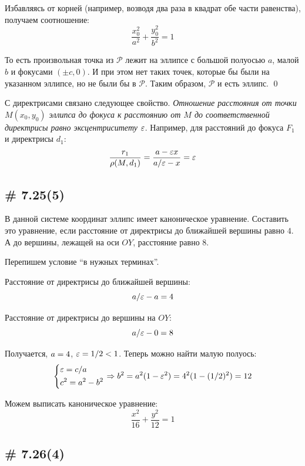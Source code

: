 \documentclass[a4paper,12pt]{article}
\begin{document}
  Избавляясь от корней (например, возводя два раза в квадрат обе части равенства), получаем соотношение:
  \[
    \frac{x_0^2}{a^2} + \frac{y_0^2}{b^2} = 1
  \]
  
  То есть произвольная точка из $\mathcal P$ лежит на эллипсе с большой полуосью $a$, малой $b$ и фокусами $(\pm c, 0)$.
  И при этом нет таких точек, которые бы были на указанном эллипсе, но не были бы в $\mathcal P$.
  Таким образом, $\mathcal P$ и есть эллипс. \qed
  
  \medskip
  
  С директрисами связано следующее свойство.
  \emph{Отношение расстояния от точки $M(x_0, y_0)$ эллипса до фокуса к расстоянию от $M$ до соответственной директрисы равно эксцентриситету $\varepsilon$}.
  Например, для расстояний до фокуса $F_1$ и директрисы $d_1$:
  \[
    \frac{r_1}{\rho(M, d_1)} = \frac{a - \varepsilon x}{a/\varepsilon - x} = \varepsilon
  \]
  
  
  \subsection{\# 7.25(5)}
  
  В данной системе координат эллипс имеет каноническое уравнение.
  Составить это уравнение, если расстояние от директрисы до ближайшей вершины равно $4$.
  А до вершины, лежащей на оси $OY$, расстояние равно $8$.
  
  \begin{solution}
    Перепишем условие ``в нужных терминах''.
    
    Расстояние от директрисы до ближайшей вершины:
    \[
      a/\varepsilon - a = 4
    \]
    
    Расстояние от директрисы до вершины на $OY$:
    \[
      a/\varepsilon - 0 = 8
    \]
    
    Получается, $a \hm= 4$, $\eps \hm= 1/2 \hm< 1$.
    Теперь можно найти малую полуось:
    \[
      \left\{
        \begin{aligned}
          &\varepsilon = c / a\\
          &c^2 = a^2 - b^2
        \end{aligned}
      \right. \Rightarrow b^2 = a^2 (1 - \varepsilon^2) =  4^2 (1 - (1/2)^2) = 12
    \]
    
    Можем выписать каноническое уравнение:
    \[
      \frac{x^2}{16} + \frac{y^2}{12} = 1
    \]
  \end{solution}
  
  
  \subsection{\# 7.26(4)}
  
\end{document}
